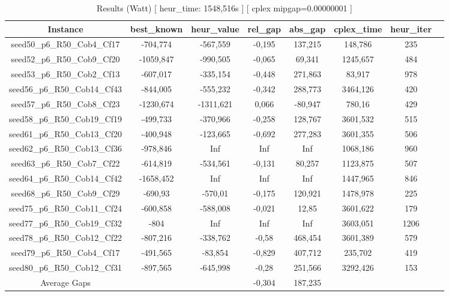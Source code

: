 \documentclass[a4paper]{article}
\begin{document}
\begin{center}
\begin{longtable}{cccccccc}
\caption{Results (Watt) [ heur\_time: 1548,516s ]  [ cplex mipgap=0.00000001 ]}
\tabularnewline
\hline
Instance & best\_known & heur\_value & rel\_gap & abs\_gap & cplex\_time & heur\_iter\\
\hline
seed50\_p6\_R50\_Cob4\_Cf17 & -704,774 & -567,559 & -0,195 & 137,215 & 148,786 & 235\\
\hline
seed52\_p6\_R50\_Cob9\_Cf20 & -1059,847 & -990,505 & -0,065 & 69,341 & 1245,657 & 484\\
\hline
seed53\_p6\_R50\_Cob2\_Cf13 & -607,017 & -335,154 & -0,448 & 271,863 & 83,917 & 978\\
\hline
seed56\_p6\_R50\_Cob14\_Cf43 & -844,005 & -555,232 & -0,342 & 288,773 & 3464,126 & 420\\
\hline
seed57\_p6\_R50\_Cob8\_Cf23 & -1230,674 & -1311,621 & 0,066 & -80,947 & 780,16 & 429\\
\hline
seed58\_p6\_R50\_Cob19\_Cf19 & -499,733 & -370,966 & -0,258 & 128,767 & 3601,532 & 515\\
\hline
seed61\_p6\_R50\_Cob13\_Cf20 & -400,948 & -123,665 & -0,692 & 277,283 & 3601,355 & 506\\
\hline
seed62\_p6\_R50\_Cob13\_Cf36 & -978,846 & Inf & Inf & Inf & 1068,186 & 960\\
\hline
seed63\_p6\_R50\_Cob7\_Cf22 & -614,819 & -534,561 & -0,131 & 80,257 & 1123,875 & 507\\
\hline
seed64\_p6\_R50\_Cob14\_Cf42 & -1658,452 & Inf & Inf & Inf & 1447,965 & 846\\
\hline
seed68\_p6\_R50\_Cob9\_Cf29 & -690,93 & -570,01 & -0,175 & 120,921 & 1478,978 & 225\\
\hline
seed75\_p6\_R50\_Cob11\_Cf24 & -600,858 & -588,008 & -0,021 & 12,85 & 3601,622 & 179\\
\hline
seed77\_p6\_R50\_Cob19\_Cf32 & -804 & Inf & Inf & Inf & 3603,051 & 1206\\
\hline
seed78\_p6\_R50\_Cob12\_Cf22 & -807,216 & -338,762 & -0,58 & 468,454 & 3601,389 & 579\\
\hline
seed79\_p6\_R50\_Cob4\_Cf17 & -491,565 & -83,854 & -0,829 & 407,712 & 235,702 & 419\\
\hline
seed80\_p6\_R50\_Cob12\_Cf31 & -897,565 & -645,998 & -0,28 & 251,566 & 3292,426 & 153\\
\hline
\hline
Average Gaps & & & -0,304 & 187,235 & & \\
\hline
\hline
\end{longtable}
\end{center}
\end{document}
